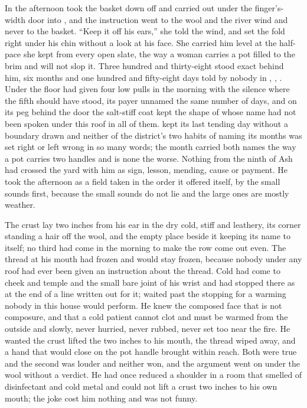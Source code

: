 In the afternoon  took the basket down off  and carried  out under the finger's-width door into , and the instruction went to the wool and the river wind and never to the basket. “Keep it off his ears,” she told the wind, and set the fold right under his chin without a look at his face. She carried him level at the half-pace she kept from every open slate, the way a woman carries a pot filled to the brim and will not slop it. Three hundred and thirty-eight stood exact behind him, six months and one hundred and fifty-eight days told by nobody in , , . Under the floor  had given four low pulls in the morning with the silence where the fifth should have stood, its payer unnamed the same number of days, and on its peg behind the door the salt-stiff coat kept the shape of  whose name had not been spoken under this roof in all of them.  kept its last tending day without a boundary drawn and neither of the district's two habits of naming its months was set right or left wrong in so many words; the month carried both names the way a pot carries two handles and is none the worse. Nothing from the ninth of Ash had crossed the yard with him as sign, lesson, mending, cause or payment. He took the afternoon as a field taken in the order it offered itself, by the small sounds first, because the small sounds do not lie and the large ones are mostly weather.

The crust lay two inches from his ear in the dry cold, stiff and leathery, its corner standing a hair off the wool, and the empty place beside it keeping its name to itself; no third had come in the morning to make the row come out even. The thread at his mouth had frozen and would stay frozen, because nobody under any roof had ever been given an instruction about the thread. Cold had come to cheek and temple and the small bare joint of his wrist and had stopped there as at the end of a line written out for it;  waited past the stopping for a warming nobody in this house would perform. He knew the composed face that is not composure, and that a cold patient cannot clot and must be warmed from the outside and slowly, never hurried, never rubbed, never set too near the fire. He wanted the crust lifted the two inches to his mouth, the thread wiped away, and a hand that would close on the pot handle brought within reach. Both were true and the second was louder and neither won, and the argument went on under the wool without a verdict. He had once reduced a shoulder in a room that smelled of disinfectant and cold metal and could not lift a crust two inches to his own mouth; the joke cost him nothing and was not funny.

